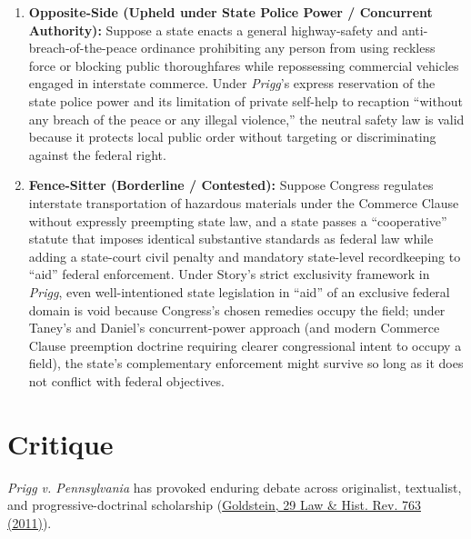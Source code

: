 \documentclass[12pt]{article}
\begin{document}
\begin{enumerate}
\item \textbf{Opposite-Side (Upheld under State Police Power / Concurrent Authority):} Suppose a state enacts a general highway-safety and anti-breach-of-the-peace ordinance prohibiting any person from using reckless force or blocking public thoroughfares while repossessing commercial vehicles engaged in interstate commerce. Under \textit{Prigg}'s express reservation of the state police power and its limitation of private self-help to recaption ``without any breach of the peace or any illegal violence,'' the neutral safety law is valid because it protects local public order without targeting or discriminating against the federal right.
\item \textbf{Fence-Sitter (Borderline / Contested):} Suppose Congress regulates interstate transportation of hazardous materials under the Commerce Clause without expressly preempting state law, and a state passes a ``cooperative'' statute that imposes identical substantive standards as federal law while adding a state-court civil penalty and mandatory state-level recordkeeping to ``aid'' federal enforcement. Under Story's strict exclusivity framework in \textit{Prigg}, even well-intentioned state legislation in ``aid'' of an exclusive federal domain is void because Congress's chosen remedies occupy the field; under Taney's and Daniel's concurrent-power approach (and modern Commerce Clause preemption doctrine requiring clearer congressional intent to occupy a field), the state's complementary enforcement might survive so long as it does not conflict with federal objectives.
\end{enumerate}

\section{Critique}
\textit{Prigg v. Pennsylvania} has provoked enduring debate across originalist, textualist, and progressive-doctrinal scholarship (\href{https://www.cambridge.org/core/journals/law-and-history-review/article/triumph-of-freedom-after-all-prigg-v-pennsylvania-reexamined/A0B7452002A367E4EFE865A3375F9D0E}{Goldstein, 29 Law \& Hist. Rev. 763 (2011)}).
\end{document}
